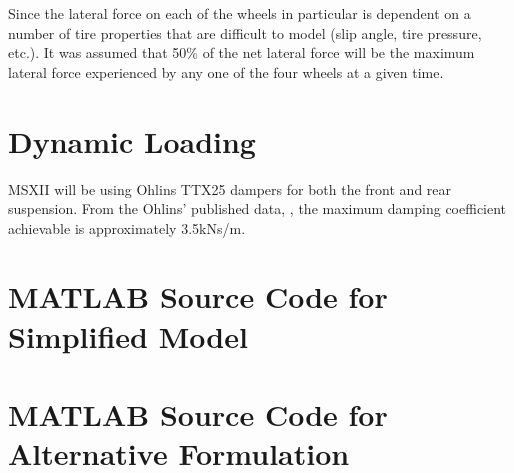 \documentclass[12pt]{article}
\begin{document}
Since the lateral force on each of the wheels in particular is dependent on a number of tire properties that are difficult to model (slip angle, tire pressure, etc.). It was assumed that 50\% of the net lateral force will be the maximum lateral force experienced by any one of the four wheels at a given time. 

\section{Dynamic Loading}
MSXII will be using Ohlins TTX25 dampers for both the front and rear suspension. From the Ohlins' published data, \cite{ohlins}, the maximum damping coefficient achievable is approximately 3.5kNs/m. 

\pagebreak
{}


\pagebreak
\appendix
\section{MATLAB Source Code for Simplified Model}
\label{app:simple}

\pagebreak
\section{MATLAB Source Code for Alternative Formulation}
\label{app:alternative}

\end{document}
